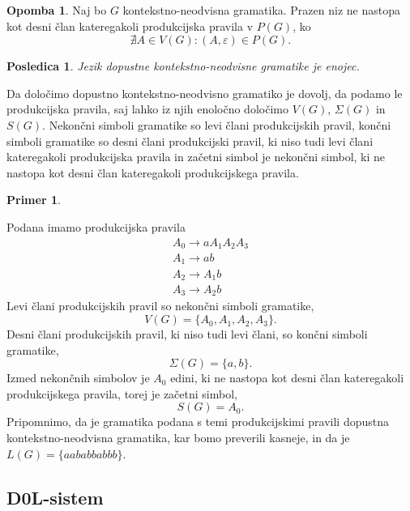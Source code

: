\documentclass{amsart}
\theoremstyle{definition}
\newtheorem{primer}[definicija]{Primer}
\newtheorem{opomba}[definicija]{Opomba}
\theoremstyle{plain} %
\newtheorem{posledica}[definicija]{Posledica}
\begin{document}
\begin{opomba}
    
    Naj bo $ G $ kontekstno-neodvisna gramatika. Prazen niz ne nastopa kot desni član kateregakoli produkcijska pravila v $ P(G) $, ko
    \[
        \nexists A \in V(G) \colon (A, \varepsilon) \in P(G).
    \]

\end{opomba}

\begin{posledica}
    
    Jezik dopustne kontekstno-neodvisne gramatike je enojec.

\end{posledica}

Da določimo dopustno kontekstno-neodvisno gramatiko je dovolj, da podamo le produkcijska pravila,
saj lahko iz njih enoločno določimo $ V(G) $, $ \Sigma(G) $ in $ S(G) $. Nekončni simboli gramatike
so levi člani produkcijskih pravil, končni simboli gramatike so desni člani produkcijski pravil, ki
niso tudi levi člani kateregakoli produkcijska pravila in začetni simbol je nekončni simbol, ki 
ne nastopa kot desni član kateregakoli produkcijskega pravila.

\begin{primer}\label{dopustna}

    Podana imamo produkcijska pravila
    \begin{gather*}
        A_0 \rightarrow aA_1A_2A_3 \\
        A_1 \rightarrow ab \\
        A_2 \rightarrow A_1b \\
        A_3 \rightarrow A_2b
    \end{gather*}
    Levi člani produkcijskih pravil so nekončni simboli gramatike,
    \[
        V(G) = \{ A_0, A_1, A_2, A_3 \}.
    \]
    Desni člani produkcijskih pravil, ki niso tudi levi člani, so končni simboli gramatike,
    \[
        \Sigma(G) = \{ a, b \}.
    \]
    Izmed nekončnih simbolov je $ A_0 $ edini, ki ne nastopa kot desni član kateregakoli
    produkcijskega pravila, torej je začetni simbol,
    \[
        S(G) = A_0.
    \]
    Pripomnimo, da je gramatika podana s temi produkcijskimi pravili dopustna kontekstno-neodvisna
    gramatika, kar bomo preverili kasneje, in da je $ L(G) = \{ aababbabbb \} $.

\end{primer}

\subsection*{D0L-sistem}
\end{document}
